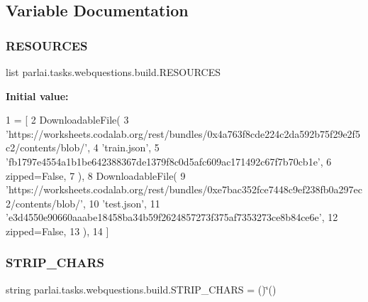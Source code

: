 \subsection{Variable Documentation}
\mbox{\label{namespaceparlai_1_1tasks_1_1webquestions_1_1build_a8e31c90df1a66040d2a9656d809fe41a}} 
\subsubsection{\texorpdfstring{R\+E\+S\+O\+U\+R\+C\+ES}{RESOURCES}}
{\footnotesize\ttfamily list parlai.\+tasks.\+webquestions.\+build.\+R\+E\+S\+O\+U\+R\+C\+ES}

{\bfseries Initial value\+:}
\begin{DoxyCode}
1 =  [
2     DownloadableFile(
3         \textcolor{stringliteral}{'https://worksheets.codalab.org/rest/bundles/0x4a763f8cde224c2da592b75f29e2f5c2/contents/blob/'},
4         \textcolor{stringliteral}{'train.json'},
5         \textcolor{stringliteral}{'fb1797e4554a1b1be642388367de1379f8c0d5afc609ac171492c67f7b70cb1e'},
6         zipped=\textcolor{keyword}{False},
7     ),
8     DownloadableFile(
9         \textcolor{stringliteral}{'https://worksheets.codalab.org/rest/bundles/0xe7bac352fce7448c9ef238fb0a297ec2/contents/blob/'},
10         \textcolor{stringliteral}{'test.json'},
11         \textcolor{stringliteral}{'e3d4550e90660aaabe18458ba34b59f2624857273f375af7353273ce8b84ce6e'},
12         zipped=\textcolor{keyword}{False},
13     ),
14 ]
\end{DoxyCode}
\mbox{\label{namespaceparlai_1_1tasks_1_1webquestions_1_1build_a199339b3ddbfe999e55a41d81af81def}} 
\subsubsection{\texorpdfstring{S\+T\+R\+I\+P\+\_\+\+C\+H\+A\+RS}{STRIP\_CHARS}}
{\footnotesize\ttfamily string parlai.\+tasks.\+webquestions.\+build.\+S\+T\+R\+I\+P\+\_\+\+C\+H\+A\+RS = \textquotesingle{} ()\char`\"{}()\textquotesingle{}}

